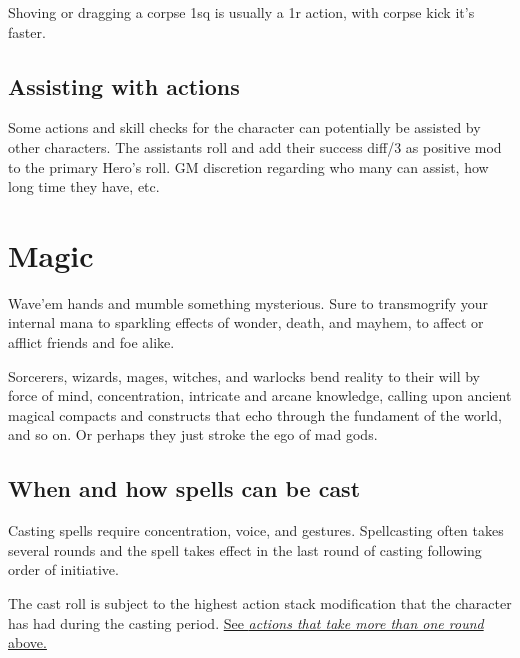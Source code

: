 Shoving or dragging a corpse 1sq is usually a 1r action, with corpse kick it's faster.


\subsection*{Assisting with actions}
Some actions and skill checks for the character can potentially be assisted by other characters. The assistants roll and add their success diff/3 as positive mod to the primary Hero's roll. GM discretion regarding who many can assist, how long time they have, etc.












\section*{Magic}


Wave'em hands and mumble something mysterious. Sure to transmogrify your internal mana to sparkling effects of wonder, death, and mayhem, to affect or afflict friends and foe alike.

Sorcerers, wizards, mages, witches, and warlocks bend reality to their will by force of mind, concentration, intricate and arcane knowledge, calling upon ancient magical compacts and constructs that echo through the fundament of the world, and so on. Or perhaps they just stroke the ego of mad gods.


\subsection*{When and how spells can be cast}
Casting spells require concentration, voice, and gestures. Spellcasting often takes several rounds and the spell takes effect in the last round of casting following order of initiative.

The cast roll is subject to the highest action stack modification that the character has had during the casting period. \hyperref[multiroundactions]{See \emph{actions that take more than one round} above.}

